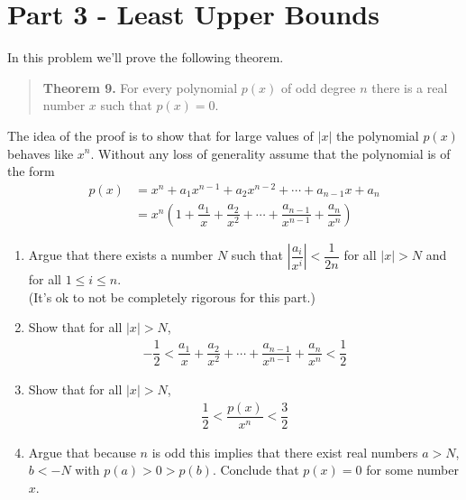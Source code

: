 \documentclass[9pt, a4paper, oneside]{amsart}
\begin{document}
\newpage
\section*{Part 3 - Least Upper Bounds}
\begin{questions}[resume]
	\item In this problem we'll prove the following theorem.
	\begin{quote}
		\textbf{Theorem 9.} For every polynomial $ p(x)$ of odd degree $ n$ there is a real number $ x$ such that $ p(x)=0$.
	\end{quote}
	The idea of the proof is to show that for large values of $|x|$ the polynomial $ p(x)$ behaves like $ x^n$. Without any loss of generality assume that the polynomial is of the form
	\begin{align*}
		p(x) & = x^n + a_{1} x^{n-1} + a_{2} x^{n-2} + \cdots + a_{n-1} x + a_n                                                      \\
		     & = x^n\left( 1 + \dfrac{a_{1}} {x} + \dfrac{a_{2}} {x^2} + \cdots + \dfrac{a_{n-1}}{x^{n-1}} + \dfrac{a_n}{x^n}\right)
	\end{align*}
	\begin{enumerate}
		\item Argue that there exists a number $ N$ such that $ \left|\dfrac{a_{i}}{x^{i}}\right| < \dfrac{1}{2n}$ for all $ |x| > N$ and for all $1 \le i \le n$. \\(It's ok to not be completely rigorous for this part.)
		\item Show that for all $ |x| > N$,
		      \begin{align*}
		      	-\dfrac{1}{2} < \dfrac{a_{1}} {x} + \dfrac{a_{2}} {x^2} + \cdots + \dfrac{a_{n-1}}{x^{n-1}} + \dfrac{a_n}{x^n} < \dfrac{1}{2}
		      \end{align*}
		\item
		      Show that for all $ |x| > N$,
		      \begin{align*}
		      	\dfrac{1}{2} < \dfrac{p(x)}{x^n} < \dfrac{3}{2}
		      \end{align*}
		\item Argue that because $ n$ is odd this implies that there exist real numbers $ a > N$, $b < -N$ with $ p(a) > 0 > p(b)$. Conclude that $ p(x) = 0$ for some number $ x$.
	\end{enumerate}


\end{questions}
\end{document}
